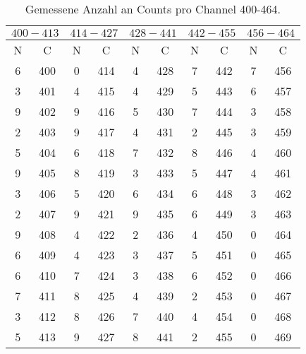  \begin{table}
    \centering
    \caption{Gemessene Anzahl an Counts pro Channel 400-464.} 
    \label{}
    \label{3}
    \begin{tabular}{c c || c c || c c || c c || c c}
        \midrule
        \multicolumn{2}{c}{$400-413$} & \multicolumn{2}{c}{$414-427$} & \multicolumn{2}{c}{$428-441$} & \multicolumn{2}{c}{$442-455$} & \multicolumn{2}{c}{$456-464$} \\
        \midrule
        N & C & N & C & N & C & N & C & N & C \\
        \midrule
6    &   400 & 0    &   414 & 4     &  428 &7      & 442  & 7    &   456    \\
3    &   401 & 4    &   415 & 4     &  429 &5      & 443  & 6    &   457    \\
9    &   402 & 9    &   416 & 5     &  430 &7      & 444  & 3    &   458    \\
2    &   403 & 9    &   417 & 4     &  431 &2      & 445  & 3    &   459    \\
5    &   404 & 6    &   418 & 7     &  432 &8      & 446  & 4    &   460    \\
9    &   405 & 8    &   419 & 3     &  433 &5      & 447  & 4    &   461    \\
3    &   406 & 5    &   420 & 6     &  434 &6      & 448  & 3    &   462    \\
2    &   407 & 9    &   421 & 9     &  435 &6      & 449  & 3    &   463    \\
9    &   408 & 4    &   422 & 2     &  436 &4      & 450  & 0    &   464    \\
6    &   409 & 4    &   423 & 3     &  437 &5      & 451  & 0    &   465    \\
6    &   410 & 7    &   424 & 3     &  438 &6      & 452  & 0    &   466    \\
7    &   411 & 8    &   425 & 4     &  439 &2      & 453  & 0    &   467    \\
3    &   412 & 8    &   426 & 7     &  440 &4      & 454  & 0    &   468    \\
5    &   413 & 9    &   427 & 8     &  441 &2      & 455  & 0    &   469    \\
    \end{tabular}
\end{table}